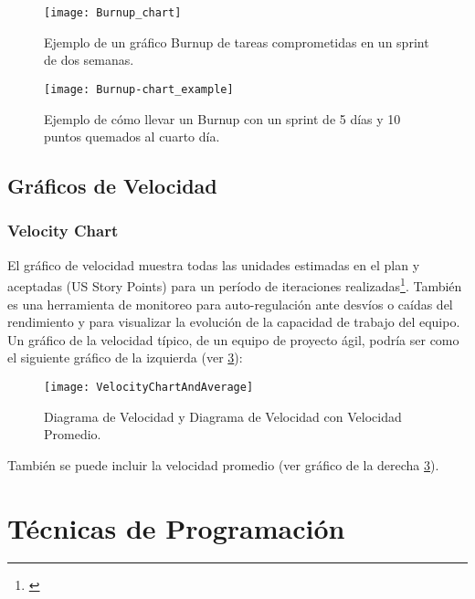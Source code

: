 \begin{figure}[h]
  \centering
  \texttt{[image: Burnup\_chart]}
  \caption{Ejemplo de un gráfico Burnup de tareas comprometidas en un sprint de dos semanas.}
  \centering
  \label{fig:Burnup_chart} %
\end{figure}

\begin{figure}[h]
  \centering
  \texttt{[image: Burnup-chart\_example]}
  \caption{Ejemplo de cómo llevar un Burnup con un sprint de 5 días y 10 puntos quemados al cuarto día.}
  \centering
  \label{fig:Burnup-chart_example} %
\end{figure}

\newpage
\subsection{Gráficos de Velocidad}

\subsubsection{Velocity Chart}

El gráfico de velocidad muestra todas las unidades estimadas en el plan y aceptadas (US Story Points) para un período de iteraciones realizadas\footnote{\cite{Scrum-Alliance-2014}}. También es una herramienta de monitoreo para auto-regulación ante desvíos o caídas del rendimiento y para visualizar la evolución de la capacidad de trabajo del equipo. Un gráfico de la velocidad típico, de un equipo de proyecto ágil, podría ser como el siguiente gráfico de la izquierda (ver \ref{fig:VelocityChartAndAverage}):

\begin{figure}[h]
  \centering
  \texttt{[image: VelocityChartAndAverage]}
  \caption{Diagrama de Velocidad y Diagrama de Velocidad con Velocidad Promedio.}
  \centering
  \label{fig:VelocityChartAndAverage} %
\end{figure}

También se puede incluir la velocidad promedio (ver gráfico de la derecha \ref{fig:VelocityChartAndAverage}).


\newpage
\section{Técnicas de Programación}

